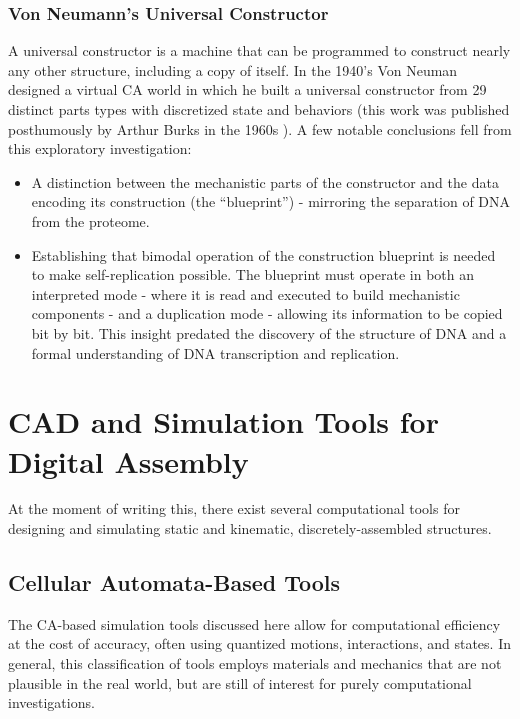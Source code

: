 {\subsubsection{Von Neumann's Universal Constructor}

A universal constructor is a machine that can be programmed to construct nearly any other structure, including a copy of itself.  In the 1940's Von Neuman designed a virtual CA world in which he built a universal constructor from 29 distinct parts types with discretized state and behaviors (this work was published posthumously by Arthur Burks in the 1960s \cite{Burks1969}).  A few notable conclusions fell from this exploratory investigation:\\

\begin{itemize}
\item{A distinction between the mechanistic parts of the constructor and the data encoding its construction (the ``blueprint'') - mirroring the separation of DNA from the proteome.}
\item{Establishing that bimodal operation of the construction blueprint is needed to make self-replication possible.  The blueprint must operate in both an interpreted mode - where it is read and executed to build mechanistic components - and a duplication mode - allowing its information to be copied bit by bit.  This insight predated the discovery of the structure of DNA and a formal understanding of DNA transcription and replication.}
\end{itemize}

\section{CAD and Simulation Tools for Digital Assembly}

At the moment of writing this, there exist several computational tools for designing and simulating static and kinematic, discretely-assembled structures.

\subsection{Cellular Automata-Based Tools}

The CA-based simulation tools discussed here allow for computational efficiency at the cost of accuracy, often using quantized motions, interactions, and states.  In general, this classification of tools employs materials and mechanics that are not plausible in the real world, but are still of interest for purely computational investigations.\\

}
